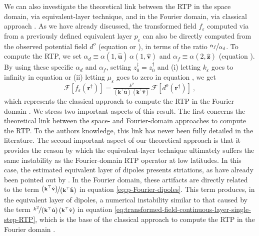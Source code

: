 We can also investigate the theoretical link between the RTP in the space domain, 
via equivalent-layer technique, and in the Fourier domain, via classical approach \citep[e.g., ][ p. 331]{blakely1996}. 
As we have already discussed, the transformed field $f_{\varepsilon}$ computed via  
from a previously defined equivalent layer $p_{\varepsilon}$ can also be directly 
computed from the observed potential field $d^{o}$ (equation 
or ), 
in terms of the ratio $\nicefrac{\alpha_{f}}{\alpha_{d}}$.
To compute the RTP, we set $\alpha_{d} \equiv \alpha(1, \hat{\mathbf{u}}) \, \alpha(1, \hat{\mathbf{v}})$ 
and $\alpha_{f} \equiv \alpha(2, \hat{\mathbf{z}})$ (equation ).
By using these specific $\alpha_{d}$ and $\alpha_{f}$, setting $z^{\ddagger}_{0} = z^{\dagger}_{0}$ and 
(i) letting $k_{\varepsilon}$ goes to infinity in equation  or
(ii) letting $\mu_{\varepsilon}$ goes to zero in equation , we get 
\begin{equation}
	\mathcal{F} [ f_{\varepsilon}(\mathbf{r}^{\dagger}) ] =
	\tfrac{k^{2}}{\left(\mathbf{k}^{\top} \hat{\mathbf{u}} \right) \, \left(\mathbf{k}^{\top} \hat{\mathbf{v}} \right)} \, 
	\mathcal{F} \left[ d^{o}(\mathbf{r}^{\dagger}) \right] \: ,
	\label{eq:transformed-field-continuous-layer-single-step-RTP}
\end{equation}
which represents the
classical approach to compute the RTP in the Fourier domain \citep[e.g., ][ p. 331]{blakely1996}.
We stress two important aspects of this result. The first concerns the theoretical link 
between the space- and Fourier-domain approaches to compute the RTP. To the authors knowledge, this link has never been fully 
detailed in the literature.
The second important aspect of our theoretical approach is that it provides the 
reason by which the equivalent-layer technique ultimately suffers the same instability as 
the Fourier-domain RTP operator at low latitudes. In this case, the estimated equivalent layer of dipoles 
presents striations, as have already been pointed out by \citet{li_etal2014}. 
In the Fourier domain, these artifacts are directly related to the term 
$\nicefrac{\left(\mathbf{k}^{\top} \hat{\mathbf{v}} \right)}{\left(\mathbf{k}^{\top} \hat{\mathbf{h}} \right)}$ 
in equation \ref{eq:p-Fourier-dipoles}. This term produces, in the equivalent layer of dipoles, a 
numerical instability similar to that caused by the term 
$\nicefrac{k^{2}}{\left(\mathbf{k}^{\top} \hat{\mathbf{u}} \right) \, \left(\mathbf{k}^{\top} \hat{\mathbf{v}} \right)}$ in equation 
\ref{eq:transformed-field-continuous-layer-single-step-RTP},
which is the base of the classical approach to compute the RTP in the Fourier domain \citep[e.g., ][ p. 331]{blakely1996}.



